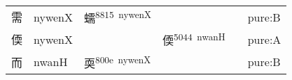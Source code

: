 \documentclass[14pt,a4paper]{scrartcl}
\begin{document}
\begin{longtable}[c]{@{}llllll@{}}
\begin{minipage}[t]{0.14\columnwidth}
需
\strut\end{minipage} &
\begin{minipage}[t]{0.14\columnwidth}\raggedright\strut
nywenX
\strut\end{minipage} &
\begin{minipage}[t]{0.14\columnwidth}\raggedright\strut
蠕\textsuperscript{8815~nywenX}
\strut\end{minipage} &
\begin{minipage}[t]{0.14\columnwidth}\raggedright\strut
\strut\end{minipage} &
\begin{minipage}[t]{0.14\columnwidth}\raggedright\strut
\strut\end{minipage} &
\begin{minipage}[t]{0.14\columnwidth}\raggedright\strut
pure:B
\strut\end{minipage}\tabularnewline
\begin{minipage}[t]{0.14\columnwidth}\raggedright\strut
偄
\strut\end{minipage} &
\begin{minipage}[t]{0.14\columnwidth}\raggedright\strut
nywenX
\strut\end{minipage} &
\begin{minipage}[t]{0.14\columnwidth}\raggedright\strut
\strut\end{minipage} &
\begin{minipage}[t]{0.14\columnwidth}\raggedright\strut
偄\textsuperscript{5044~nwanH}
\strut\end{minipage} &
\begin{minipage}[t]{0.14\columnwidth}\raggedright\strut
\strut\end{minipage} &
\begin{minipage}[t]{0.14\columnwidth}\raggedright\strut
pure:A
\strut\end{minipage}\tabularnewline
\begin{minipage}[t]{0.14\columnwidth}\raggedright\strut
而
\strut\end{minipage} &
\begin{minipage}[t]{0.14\columnwidth}\raggedright\strut
nwanH
\strut\end{minipage} &
\begin{minipage}[t]{0.14\columnwidth}\raggedright\strut
耎\textsuperscript{800e~nywenX}
\strut\end{minipage} &
\begin{minipage}[t]{0.14\columnwidth}\raggedright\strut
\strut\end{minipage} &
\begin{minipage}[t]{0.14\columnwidth}\raggedright\strut
\strut\end{minipage} &
\begin{minipage}[t]{0.14\columnwidth}\raggedright\strut
pure:B
\strut\end{minipage}\tabularnewline
\bottomrule
\end{longtable}
\end{document}
